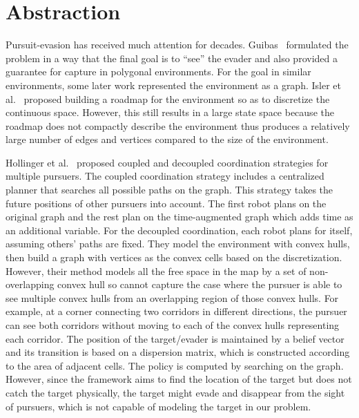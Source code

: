 \documentclass[../main.tex]{subfiles}
\begin{document}
\section{Abstraction}
Pursuit-evasion has received much attention 
for decades. Guibas~\cite{guibas1999visibility} formulated the problem in a way that the final goal is to ``see'' the evader and also provided a guarantee for capture in polygonal environments. 
For the goal in similar environments, some later work represented the environment as a graph. Isler et al.~\cite{isler2005roadmap} proposed building a roadmap for the environment so as to discretize the continuous space. However, this still results in a large state space because the roadmap does not compactly describe the environment thus produces a relatively large number of edges and vertices compared to the size of the environment.

Hollinger et al.~\cite{hollinger2007probabilistic,hollinger2009efficient}
proposed coupled and decoupled coordination strategies for multiple pursuers. The coupled coordination strategy includes a centralized planner that searches all possible paths on the graph. This strategy takes the future positions of other pursuers into account. The first robot plans on the original graph and the rest plan on the time-augmented graph which adds time as an additional variable.
For the decoupled coordination, each robot plans for itself, assuming others' paths  are fixed. They model the environment with convex hulls, then build a graph with vertices as the convex cells based on the discretization. However, their method models all the free space in the map by a set of non-overlapping convex hull so cannot capture the case where the pursuer is able to see multiple convex hulls from an overlapping region of those convex hulls. For example, at a corner connecting two corridors in different directions, the pursuer can see both corridors without moving to each of the convex hulls representing each corridor.
The position of the target/evader is maintained by a belief vector and its transition is based on a dispersion matrix, which is constructed according to the area of adjacent cells. The policy is computed by searching on the graph. However, since the framework aims to find the location of the target but does not catch the target physically, the target might evade and disappear from the sight of pursuers, which is not capable of modeling the target in our problem.
\end{document}
